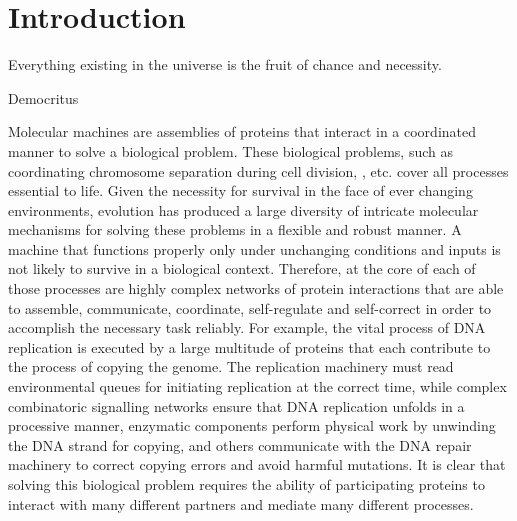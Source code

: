 \chapter{Introduction}

\epigraph{Everything existing in the universe is the fruit of chance and necessity.}{Democritus}

Molecular machines are assemblies of proteins that interact in a coordinated manner to solve a biological problem. These biological problems, such as coordinating chromosome separation during cell division, , etc.  cover all processes essential to life. Given the necessity for survival in the face of ever changing environments, evolution has produced a large diversity of intricate molecular mechanisms for solving these problems in a flexible and robust manner. A machine that functions properly only under unchanging conditions and inputs is not likely to survive in a biological context. Therefore, at the core of each of those processes are highly complex networks of protein interactions that are able to assemble, communicate, coordinate, self-regulate and self-correct in order to accomplish the necessary task reliably. For example, the vital process of DNA replication is executed by a large multitude of proteins that each contribute to the process of copying the genome. The replication machinery must read environmental queues for initiating replication at the correct time, while complex combinatoric signalling networks ensure that DNA replication unfolds in a processive manner, enzymatic components perform physical work by unwinding the DNA strand for copying, and others communicate with the DNA repair machinery to correct copying errors and avoid harmful mutations. It is clear that solving this biological problem requires the ability of participating proteins to interact with many different partners and mediate many different processes.  

